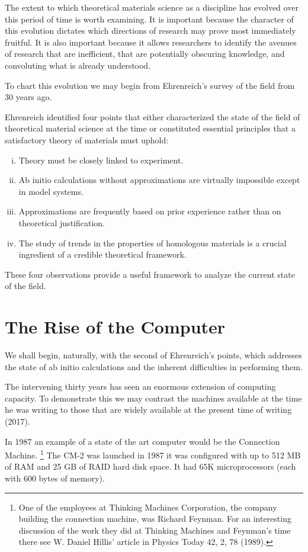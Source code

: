 The extent to which theoretical materials science as a discipline has evolved 
over this period of time is worth examining. 
It is important because the character of this evolution dictates which 
directions of research may prove most immediately fruitful. It is also important 
because it allows researchers to identify the avenues
of research that are inefficient, that are potentially obscuring knowledge, 
and convoluting what is already understood. 

To chart this evolution we may begin from Ehrenreich's survey of the field from 30 years ago.

Ehrenreich identified four points that either characterized the state 
of the field of theoretical material science at the time or constituted essential principles 
that a satisfactory theory of materials must uphold:
%
\begin{enumerate}[i)]
\item Theory must be closely linked to experiment.
\item Ab initio calculations without approximations are virtually impossible 
      except in model systems.
\item Approximations are frequently based on prior experience rather 
      than on theoretical justification.
\item The study of trends in the properties of homologous materials 
      is a crucial ingredient of a credible theoretical framework.
\end{enumerate}
%
These four observations provide a useful framework to analyze the current state of the field.

\section{The Rise of the Computer}
\label{sec:riseofcomp}
We shall begin, naturally, with the second of Ehrenreich's points, 
which addresses the state of ab initio calculations
and the inherent difficulties in performing them. 

The intervening thirty years has seen an enormous extension of computing capacity. 
To demonstrate this we may contrast the machines available at the time
he was writing to those that are widely available at the present time of writing (2017). 

In 1987 an example of a state of the art computer would be the Connection Machine.
\footnote{One of the employees at Thinking Machines Corporation,
the company building the connection machine, was Richard Feynman.
For an interesting discussion of the work they
did at Thinking Machines and Feynman's time there see W. Daniel
Hillis' article in Physics Today 42, 2, 78 (1989).}
The CM-2 was launched in 1987 it was configured with up to 512 MB of RAM and 25 GB of RAID
hard disk space. It had 65K microprocessors (each with 600 bytes of memory). 

